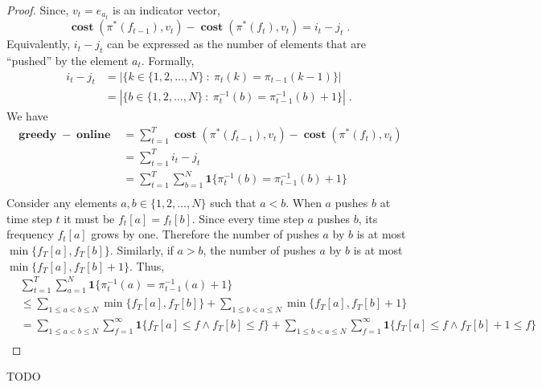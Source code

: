 \documentclass[12pt]{article}
\newcommand{\indicator}{\mathbf{1}}
\DeclareMathOperator{\cost}{\mathbf{cost}}
\DeclareMathOperator{\greedy}{\mathbf{greedy}}
\DeclareMathOperator{\online}{\mathbf{online}}
\begin{document}
\begin{proof}
Since, $v_t = e_{a_t}$ is an indicator vector,
$$
\cost(\pi^*(f_{t-1}), v_t) - \cost(\pi^*(f_t), v_t) = i_t - j_t \; .
$$
Equivalently, $i_t - j_t$ can be expressed as the number of elements that are
``pushed'' by the element $a_t$. Formally,
\begin{align*}
i_t - j_t
& = |\{ k \in \{1,2,\dots,N\} ~:~ \pi_t(k) = \pi_{t-1}(k-1) \}| \\
& = |\{ b \in \{1,2,\dots,N\} ~:~ \pi_t^{-1}(b) = \pi_{t-1}^{-1}(b) + 1 \}| \; .
\end{align*}
We have
\begin{align*}
\greedy - \online
& = \sum_{t=1}^T \cost(\pi^*(f_{t-1}), v_t) - \cost(\pi^*(f_t), v_t) \\
& = \sum_{t=1}^T i_t - j_t \\
& = \sum_{t=1}^T \sum_{b=1}^N \indicator\{\pi_t^{-1}(b) = \pi_{t-1}^{-1}(b) + 1 \} \\
\end{align*}
Consider any elements $a,b \in \{1,2,\dots,N\}$ such that $a < b$. When $a$
pushes $b$ at time step $t$ it must be $f_t[a] = f_t[b]$. Since every time step
$a$ pushes $b$, its frequency $f_t[a]$ grows by one. Therefore the number of
pushes $a$ by $b$ is at most $\min\{f_T[a], f_T[b]\}$. Similarly, if $a > b$,
the number of pushes $a$ by $b$ is at most $\min\{f_T[a], f_T[b] + 1\}$.
Thus,
\begin{align*}
& \sum_{t=1}^T \sum_{a=1}^N \indicator\{\pi_t^{-1}(a) = \pi_{t-1}^{-1}(a) + 1 \} \\
& \le
\sum_{1 \le a < b \le N} \min\{f_T[a], f_T[b]\} +
\sum_{1 \le b < a \le N} \min\{f_T[a], f_T[b] + 1\} \\
& =
\sum_{1 \le a < b \le N} \sum_{f=1}^\infty \indicator\{f_T[a] \le f \wedge f_T[b] \le f\}
+ \sum_{1 \le b < a \le N} \sum_{f=1}^\infty \indicator\{f_T[a] \le f \wedge f_T[b] + 1 \le f\} \\
\end{align*}
\end{proof}
TODO
\end{document}
